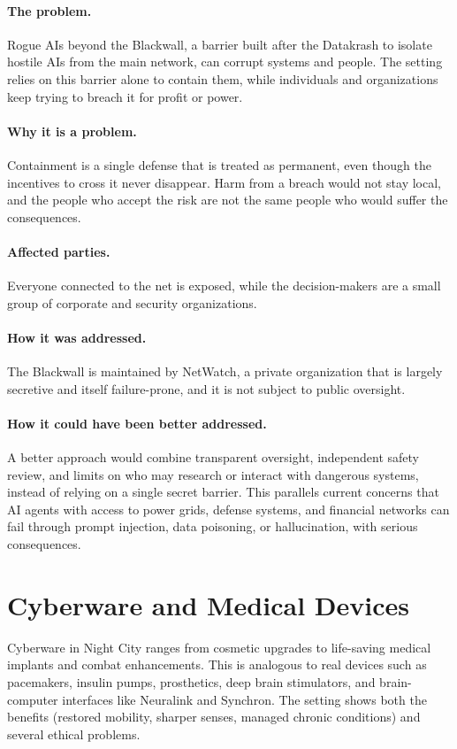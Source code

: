 \documentclass{article}%
\begin{document}
\paragraph{The problem.}
Rogue AIs beyond the Blackwall, a barrier built after the Datakrash to isolate hostile AIs from the main network, can corrupt systems and people. The setting relies on this barrier alone to contain them, while individuals and organizations keep trying to breach it for profit or power.

\paragraph{Why it is a problem.}
Containment is a single defense that is treated as permanent, even though the incentives to cross it never disappear. Harm from a breach would not stay local, and the people who accept the risk are not the same people who would suffer the consequences.

\paragraph{Affected parties.}
Everyone connected to the net is exposed, while the decision-makers are a small group of corporate and security organizations.

\paragraph{How it was addressed.}
The Blackwall is maintained by NetWatch, a private organization that is largely secretive and itself failure-prone, and it is not subject to public oversight.

\paragraph{How it could have been better addressed.}
A better approach would combine transparent oversight, independent safety review, and limits on who may research or interact with dangerous systems, instead of relying on a single secret barrier. This parallels current concerns that AI agents with access to power grids, defense systems, and financial networks can fail through prompt injection, data poisoning, or hallucination, with serious consequences.

\section{Cyberware and Medical Devices}
Cyberware in Night City ranges from cosmetic upgrades to life-saving medical implants and combat enhancements. This is analogous to real devices such as pacemakers, insulin pumps, prosthetics, deep brain stimulators, and brain-computer interfaces like Neuralink and Synchron. The setting shows both the benefits (restored mobility, sharper senses, managed chronic conditions) and several ethical problems.
\end{document}
